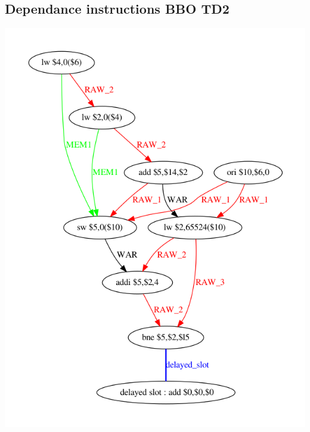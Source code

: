 \documentclass[11pt, openany]{article}
\begin{document}
\subsection{Dependance instructions BBO TD2}
\label{chap:Dep}

\includegraphics[scale=0.6]{images/depBBOtd2.png}~\\[1.5cm]
\end{document}
